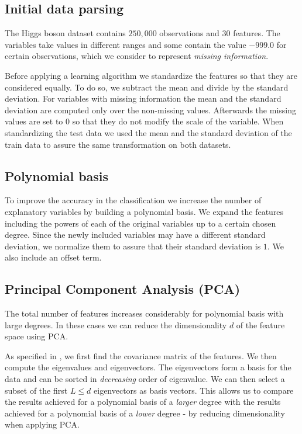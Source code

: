 \documentclass[10pt,conference,compsocconf]{IEEEtran}
\begin{document}
	\subsection{Initial data parsing} %
	\label{sub:initial_data_parsing}
  	The Higgs boson dataset contains $250,000$ observations and $30$ features. The variables take values in different ranges and some contain the value $-999.0$ for certain observations, which we consider to represent \emph{missing information}. %

  	Before applying a learning algorithm we standardize the features so that they are considered equally. To do so, we subtract the mean and divide by the standard deviation. For variables with missing information the mean and the standard deviation are computed only over the non-missing values. Afterwards the missing values are set to $0$ so that they do not modify the scale of the variable. When standardizing the test data we used the mean and the standard deviation of the train data to assure the same transformation on both datasets.%

	\subsection{Polynomial basis} %
	\label{sub:polynomial_basis}
  	To improve the accuracy in the classification we increase the number of explanatory variables by building a polynomial basis. We expand the features including the powers of each of the original variables up to a certain chosen degree. Since the newly included variables may have a different standard deviation, we normalize them to assure that their standard deviation is $1$. We also include an offset term.

	\subsection{Principal Component Analysis (PCA)} %
	\label{sub:principal_component_analysis}
  	The total number of features increases considerably for polynomial basis with large degrees. In these cases we can reduce the dimensionality $d$ of the feature space using PCA.

  	As specified in \cite{smith02}, we first find the covariance matrix of the features. We then compute the eigenvalues and eigenvectors. The eigenvectors form a basis for the data and can be sorted in \emph{decreasing} order of eigenvalue. We can then select a subset of the first $L\leq d$ eigenvectors as basis vectors. This allows us to compare the results achieved for a polynomial basis of a \textit{larger} degree with the results achieved for a polynomial basis of a \textit{lower} degree - by reducing dimensionality when applying PCA.
\end{document}
